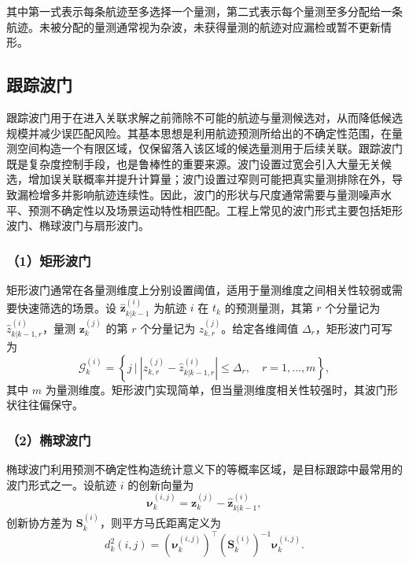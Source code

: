 \documentclass{xdupgthesis}
\begin{document}
其中第一式表示每条航迹至多选择一个量测，第二式表示每个量测至多分配给一条航迹。未被分配的量测通常视为杂波，未获得量测的航迹对应漏检或暂不更新情形。

\subsection{跟踪波门}

跟踪波门用于在进入关联求解之前筛除不可能的航迹与量测候选对，从而降低候选规模并减少误匹配风险。其基本思想是利用航迹预测所给出的不确定性范围，在量测空间构造一个有限区域，仅保留落入该区域的候选量测用于后续关联。跟踪波门既是复杂度控制手段，也是鲁棒性的重要来源。波门设置过宽会引入大量无关候选，增加误关联概率并提升计算量；波门设置过窄则可能把真实量测排除在外，导致漏检增多并影响航迹连续性。因此，波门的形状与尺度通常需要与量测噪声水平、预测不确定性以及场景运动特性相匹配。工程上常见的波门形式主要包括矩形波门、椭球波门与扇形波门。

\subsubsection{（1）矩形波门}

矩形波门通常在各量测维度上分别设置阈值，适用于量测维度之间相关性较弱或需要快速筛选的场景。设 $\hat{\mathbf{z}}^{(i)}_{k|k-1}$ 为航迹 $i$ 在 $t_k$ 的预测量测，其第 $r$ 个分量记为 $\hat{z}^{(i)}_{k|k-1,r}$，量测 $\mathbf{z}^{(j)}_k$ 的第 $r$ 个分量记为 $z^{(j)}_{k,r}$。给定各维阈值 $\Delta_r$，矩形波门可写为
\begin{equation}
	\mathcal{G}^{(i)}_k
	=
	\left\{
	j ~\big|~
	\left|z^{(j)}_{k,r}-\hat{z}^{(i)}_{k|k-1,r}\right|
	\le \Delta_r,\quad r=1,\ldots,m
	\right\},
\end{equation}
其中 $m$ 为量测维度。矩形波门实现简单，但当量测维度相关性较强时，其波门形状往往偏保守。

\subsubsection{（2）椭球波门}

椭球波门利用预测不确定性构造统计意义下的等概率区域，是目标跟踪中最常用的波门形式之一。设航迹 $i$ 的创新向量为
\begin{equation}
	\boldsymbol{\nu}^{(i,j)}_k
	=
	\mathbf{z}^{(j)}_k
	-
	\hat{\mathbf{z}}^{(i)}_{k|k-1},
\end{equation}
创新协方差为 $\mathbf{S}^{(i)}_k$，则平方马氏距离定义为
\begin{equation}
	d_k^2(i,j)
	=
	\left(\boldsymbol{\nu}^{(i,j)}_k\right)^\top
	\left(\mathbf{S}^{(i)}_k\right)^{-1}
	\boldsymbol{\nu}^{(i,j)}_k .
\end{equation}
\end{document}
